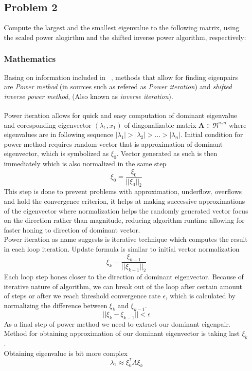 \subsection{Problem 2}
\label{sec:problem_2}


Compute the largest and the smallest eigenvalue to the following matrix, using the
scaled power alogirthm and the shifted inverse power algorithm, respectively:

\subsubsection*{Mathematics}
Basing on information included in ~\cite{Zdunek}, methods that allow for finding eigenpairs are \textit{Power method} 
(in sources such as refered as \textit{Power iteration}) and \textit{shifted inverse power method}, (Also known as \textit{inverse iteration}\cite{Demmel}).\\
\\
Power iteration allows for quick and easy computation of dominant eigenvalue and coresponding eigenvector $(\lambda_1, x_1)$ of diagonalizable matrix 
\textbf{A}$\in \mathfrak{R}^{n_xn}$ where eigenvalues are in following sequence $|\lambda_1| > |\lambda_2| > ... > |\lambda_n|$.
Initial condition for power method requires random vector that is approximation of dominant eigenvector, which is symbolized as $\xi_0$. Vector generated as such is then immediately which is also normalized in the same step 
\begin{equation*}
    \xi_0 = \frac{\xi_0}{||\xi_0||_2} 
\end{equation*}
This step is done to prevent problems with approximation, underflow, overflows and hold the convergence criterion, it helps at making successive approximations of the eigenvector where normalization helps the randomly generated vector focus on the direction rather than magnitude, reducing algorithm runtime allowing for faster honing to direction of dominant vector.\\
Power iteration as name suggests is iterative technique which computes the result in each loop iteration.
Update formula is similar to initial vector normalization
\begin{equation*}
    \xi_k = \frac{\xi_{k-1}}{||\xi_{k-1}||_2}
\end{equation*}
Each loop step hones closer to the direction of dominant eigenvector. Because of iterative nature of algorithm, we can break out of the loop after certain amount of steps or after we reach threshold convergence rate $\epsilon$, which is calculated by normalizing the difference between $\xi_k$ and $\xi_{k-1}$.
\begin{equation*}
    ||\xi_k - \xi_{k-1}|| < \epsilon
\end{equation*}
As a final step of power method we need to extract our dominant eigenpair. 
Method for obtaining approximation of our dominant eigenvector is taking last $\xi_k$.\\
Obtaining eigenvalue is bit more complex
\begin{equation*}
    \lambda_1 \approx \xi_k^T A \xi_k 
\end{equation*}

